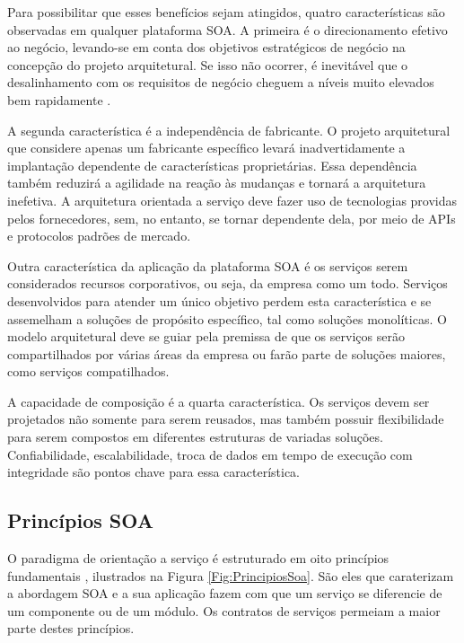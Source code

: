 Para possibilitar que esses benefícios sejam atingidos, quatro características
são observadas em qualquer plataforma SOA. A primeira é o direcionamento
efetivo ao negócio, levando-se em conta dos objetivos estratégicos de negócio na
concepção do projeto arquitetural. Se isso não ocorrer, é inevitável que o
desalinhamento com os requisitos de negócio cheguem a níveis muito elevados
bem rapidamente \cite{erl2008soaDesigPatterns}.

A segunda característica é a independência de fabricante. O projeto arquitetural
que considere apenas um fabricante específico levará inadvertidamente a
implantação dependente de características proprietárias. Essa dependência também
reduzirá a agilidade na reação às mudanças e tornará a arquitetura inefetiva. A
arquitetura orientada a serviço deve fazer uso de tecnologias providas pelos
fornecedores, sem, no entanto, se tornar dependente dela, por meio de APIs e
protocolos padrões de mercado.

Outra característica da aplicação da plataforma SOA é os serviços serem
considerados recursos corporativos, ou seja, da empresa como um todo. Serviços
desenvolvidos para atender um único objetivo perdem esta característica e se
assemelham a soluções de propósito específico, tal como soluções monolíticas. O
modelo arquitetural deve se guiar pela premissa de que os serviços serão
compartilhados por várias áreas da empresa ou farão parte de soluções maiores,
como serviços compatilhados.

A capacidade de composição é a quarta característica. Os serviços devem ser
projetados não somente para serem reusados, mas também possuir
flexibilidade para serem compostos em diferentes estruturas de variadas
soluções. Confiabilidade, escalabilidade, troca de dados em tempo de execução
com integridade são pontos chave para essa característica.



\subsection{Princípios SOA}
\label{PrincipiosSOA} 
\vspace{-6mm}

O paradigma de orientação a serviço é estruturado em oito princípios
fundamentais \cite{erl2009web}, ilustrados na Figura \ref{Fig:PrincipiosSoa}. São eles que
caraterizam a abordagem SOA e a sua aplicação fazem com que um serviço se diferencie de um componente ou de
um módulo. Os contratos de serviços permeiam a maior parte destes princípios.

